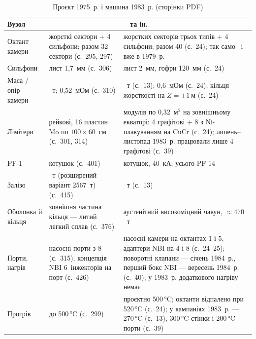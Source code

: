 \begin{table}[!tb]\centering\footnotesize\setlength{\tabcolsep}{4pt}\renewcommand{\arraystretch}{1.05}
\caption{Проєкт 1975~р. і машина 1983~р. (сторінки PDF)}\label{tab:04j-1983}
\begin{tabularx}{\textwidth}{@{}l>{\raggedright\arraybackslash}X>{\raggedright\arraybackslash}X@{}}
\toprule
Вузол & 1975~\cite{JET1975} & 1983~\cite{JETJU1983} та ін. \\
\midrule
Октант камери & 4 жорсткі сектори + 4 сильфони; разом 32 сектори (с.~295, 297) & 5 жорстких секторів трьох типів + 4 сильфони; разом 40 (с.~24); так само~\cite[с.~12]{JETBrochure1982} і вже в 1979~р.~\cite[с.~36]{JETJU1979} \\
Сильфони & лист 1,7~мм (с.~306) & лист 2~мм, гофри 120~мм (с.~24) \\
Маса / опір камери & 68~т; 0,52~мОм (с.~310) & 108~т (с.~13); 0,6~мОм (с.~24); кільця жорсткості на $Z=\pm\SI{1}{м}$ (с.~24) \\
Лімітери & 3 рейкові, 16 пластин Mo по $100\times60$~см (с.~301, 314) & 12 модулів по 0,32~м$^2$ на зовнішньому екваторі: 4 графітові + 8 з Ni-плакуванням на CuCr (с.~24); липень--листопад 1983~р. працювали лише 4 графітові (с.~39) \\
PF-1 & 10 котушок (с.~401) & 8 котушок, 40~кА; усього PF 14~\cite[с.~15]{JETBrochure1982} \\
Залізо & 2263~т (розширений варіант 2567~т) (с.~415) & 2800~т (с.~13) \\
Оболонка й кільця & зовнішня частина кільця --- литий легкий сплав (с.~376) & аустенітний високоміцний чавун, $\approx470$~т~\cite[с.~17]{JETBrochure1982} \\
Порти, нагрів & 4 насосні порти з 8 (с.~315); концепція NBI 6~інжекторів на порт (с.~426) & насосні камери на октантах 1 і 5, адаптери NBI на 4 і 8 (с.~24--25); поворотні клапани --- січень 1984~р., перший бокс NBI --- вересень 1984~р. (с.~40); у 1983~р. додаткового нагріву немає \\
Прогрів & до 500\,°C (с.~299) & проєктно 500\,°C; октанти відпалено при 520\,°C (с.~24); у кампаніях 1983~р. --- 270\,°C (с.~13), 300\,°C стінки і 200\,°C порти (с.~39) \\
\bottomrule
\end{tabularx}
\end{table}

